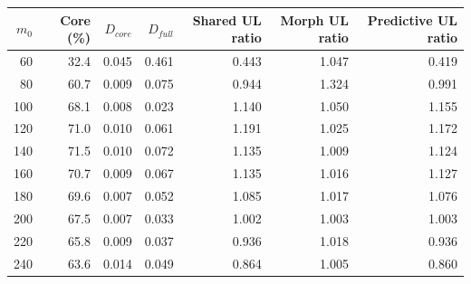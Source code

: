 \begin{tabular}{rrrrrrr}
\toprule
$m_0$ & Core (\%) & $D_{core}$ & $D_{full}$ & Shared UL ratio & Morph UL ratio & Predictive UL ratio \\
\midrule
60 & 32.4 & 0.045 & 0.461 & 0.443 & 1.047 & 0.419 \\
80 & 60.7 & 0.009 & 0.075 & 0.944 & 1.324 & 0.991 \\
100 & 68.1 & 0.008 & 0.023 & 1.140 & 1.050 & 1.155 \\
120 & 71.0 & 0.010 & 0.061 & 1.191 & 1.025 & 1.172 \\
140 & 71.5 & 0.010 & 0.072 & 1.135 & 1.009 & 1.124 \\
160 & 70.7 & 0.009 & 0.067 & 1.135 & 1.016 & 1.127 \\
180 & 69.6 & 0.007 & 0.052 & 1.085 & 1.017 & 1.076 \\
200 & 67.5 & 0.007 & 0.033 & 1.002 & 1.003 & 1.003 \\
220 & 65.8 & 0.009 & 0.037 & 0.936 & 1.018 & 0.936 \\
240 & 63.6 & 0.014 & 0.049 & 0.864 & 1.005 & 0.860 \\
\bottomrule
\end{tabular}

